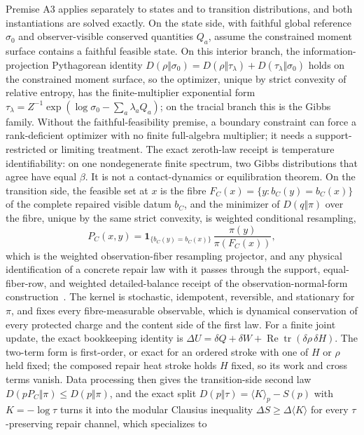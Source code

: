 \documentclass[11pt]{article}
\begin{document}
Premise A3 applies separately to states and to transition distributions,
and both instantiations are solved exactly. On the state side, with
faithful global reference \(\sigma_0\) and observer-visible conserved
quantities \(Q_a\), assume the constrained moment surface contains a faithful
feasible state. On this interior branch, the information-projection Pythagorean identity
\(D(\rho\Vert\sigma_0)=D(\rho\Vert\tau_\lambda)
+D(\tau_\lambda\Vert\sigma_0)\) holds on the constrained moment
surface, so the optimizer, unique by strict convexity of relative
entropy, has the finite-multiplier exponential form
\(\tau_\lambda=Z^{-1}\exp(\log\sigma_0-\sum_a\lambda_aQ_a)\); on the
tracial branch this is the Gibbs family. Without the faithful-feasibility
premise, a boundary constraint can force a rank-deficient optimizer with no
finite full-algebra multiplier; it needs a support-restricted or limiting
treatment. The exact zeroth-law receipt is
temperature identifiability: on one nondegenerate finite spectrum, two Gibbs
distributions that agree have equal \(\beta\). It is not a contact-dynamics
or equilibration theorem. On the transition
side, the feasible set at \(x\) is the fibre
\(F_C(x)=\{y:b_C(y)=b_C(x)\}\) of the complete repaired visible datum
\(b_C\), and the minimizer of \(D(q\Vert\pi)\) over the fibre, unique
by the same strict convexity, is weighted conditional resampling,
\[
P_C(x,y)=\mathbf 1_{\{b_C(y)=b_C(x)\}}\,
\frac{\pi(y)}{\pi(F_C(x))},
\]
which is the weighted observation-fiber resampling projector, and any
physical identification of a concrete repair law with it passes through
the support, equal-fiber-row, and weighted detailed-balance receipt
of the observation-normal-form construction~\cite{observableNormalForms}. The kernel is stochastic, idempotent,
reversible, and stationary for \(\pi\), and fixes every
fibre-measurable observable, which is dynamical conservation of every
protected charge and the content side of the first law. For a finite joint
update, the exact bookkeeping identity is
\(\Delta U=\delta Q+\delta W+\operatorname{Re}\operatorname{tr}(\delta\rho\,\delta H)\).
The two-term form is first-order, or exact for an ordered stroke with one of
\(H\) or \(\rho\) held fixed; the composed repair heat stroke holds \(H\)
fixed, so its work and cross terms vanish. Data processing then gives
the transition-side second law
\(D(pP_C\Vert\pi)\le D(p\Vert\pi)\), and the exact split
\(D(p\Vert\tau)=\langle K\rangle_p-S(p)\) with \(K=-\log\tau\)
turns it into the modular Clausius inequality
\(\Delta S\ge\Delta\langle K\rangle\) for every
\(\tau\)-preserving repair channel, which specializes to
\end{document}
